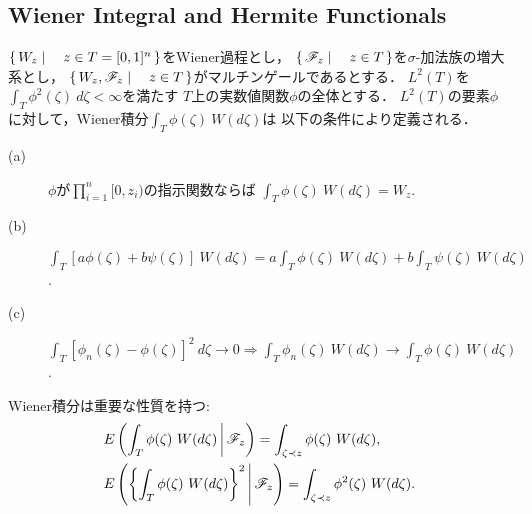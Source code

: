 \subsection{Wiener Integral and Hermite Functionals}
	$\left\{\, W_{z} \mid \quad z \in T = [0,1]^{n}\, \right\}$をWiener過程とし，
	$\left\{\, \mathscr{F}_{z} \mid \quad z \in T\, \right\}$を$\sigma$-加法族の増大系とし，
	$\left\{\, W_{z},\mathscr{F}_{z} \mid \quad z \in T\, \right\}$がマルチンゲールであるとする．
	$L^{2}(T)$を$\int_{T} \phi^{2}(\zeta)\ d\zeta < \infty$を満たす
	$T$上の実数値関数$\phi$の全体とする．
	$L^{2}(T)$の要素$\phi$に対して，Wiener積分$\int_{T} \phi(\zeta)\ W(d\zeta)$は
	以下の条件により定義される．
	
	\begin{description}
		\item[(a)] $\phi$が$\prod_{i=1}^{n} [0,z_{i})$の指示関数ならば
			$\int_{T} \phi(\zeta)\ W(d\zeta) = W_{z}$.
		
		\item[(b)] $\int_{T} [a\phi(\zeta) + b\psi(\zeta)]\ W(d\zeta)
			= a \int_{T} \phi(\zeta)\ W(d\zeta) + b \int_{T} \psi(\zeta)\ W(d\zeta)$.
		
		\item[(c)] $\int_{T} [\phi_{n}(\zeta) - \phi(\zeta)]^{2}\ d\zeta
			\longrightarrow 0 \Longrightarrow \int_{T} \phi_{n}(\zeta)\ W(d\zeta)
			\longrightarrow \int_{T} \phi(\zeta)\ W(d\zeta)$.
	\end{description}
	
	Wiener積分は重要な性質を持つ:
	\begin{align}
		&\cexp{\int_{T} \phi(\zeta)\ W(d\zeta)}{\mathscr{F}_{z}}
		= \int_{\zeta \prec z} \phi(\zeta)\ W(d\zeta), \\
		&\cexp{\left\{\int_{T} \phi(\zeta)\ W(d\zeta)\right\}^{2}}{\mathscr{F}_{z}}
		= \int_{\zeta \prec z} \phi^{2}(\zeta)\ W(d\zeta).
	\end{align}
	
